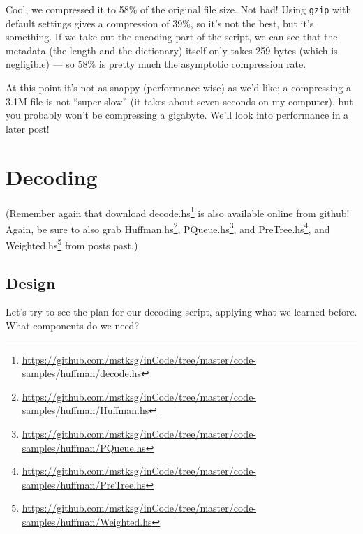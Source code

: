 \documentclass[]{article}
\renewcommand{\href}[2]{#2\footnote{\url{#1}}}
\begin{document}
Cool, we compressed it to 58\% of the original file size. Not bad! Using
\texttt{gzip} with default settings gives a compression of 39\%, so it's not the
best, but it's something. If we take out the encoding part of the script, we can
see that the metadata (the length and the dictionary) itself only takes 259
bytes (which is negligible) --- so 58\% is pretty much the asymptotic
compression rate.

At this point it's not as snappy (performance wise) as we'd like; a compressing
a 3.1M file is not ``super slow'' (it takes about seven seconds on my computer),
but you probably won't be compressing a gigabyte. We'll look into performance in
a later post!

\section{Decoding}\label{decoding}

(Remember again that download
\href{https://github.com/mstksg/inCode/tree/master/code-samples/huffman/decode.hs}{decode.hs}
is also available online from github! Again, be sure to also grab
\href{https://github.com/mstksg/inCode/tree/master/code-samples/huffman/Huffman.hs}{Huffman.hs},
\href{https://github.com/mstksg/inCode/tree/master/code-samples/huffman/PQueue.hs}{PQueue.hs},
and
\href{https://github.com/mstksg/inCode/tree/master/code-samples/huffman/PreTree.hs}{PreTree.hs},
and
\href{https://github.com/mstksg/inCode/tree/master/code-samples/huffman/Weighted.hs}{Weighted.hs}
from posts past.)

\subsection{Design}\label{design-1}

Let's try to see the plan for our decoding script, applying what we learned
before. What components do we need?
\end{document}
